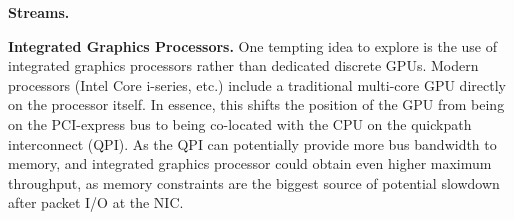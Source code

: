 \medskip \noindent \textbf{Streams.} 

\medskip \noindent \textbf{Integrated Graphics Processors.} One tempting idea
to explore is the use of integrated graphics processors rather than dedicated
discrete GPUs. Modern processors (Intel Core i-series, etc.) include a
traditional multi-core GPU directly on the processor itself. In essence, this
shifts the position of the GPU from being on the PCI-express bus to being
co-located with the CPU on the quickpath interconnect (QPI). As the QPI can
potentially provide more bus bandwidth to memory, and integrated graphics
processor could obtain even higher maximum throughput, as memory constraints
are the biggest source of potential slowdown after packet I/O at the NIC.
